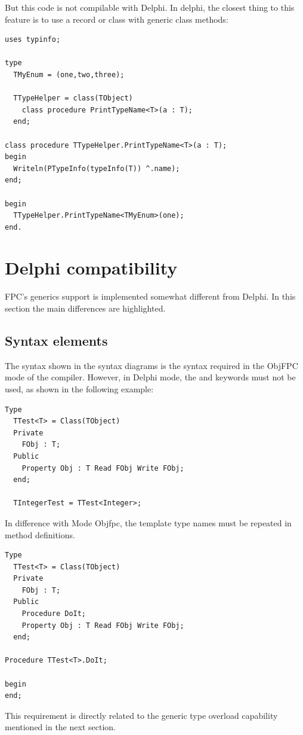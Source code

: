 But this code is not compilable with Delphi. In delphi, the closest thing to
this feature is to use a record or class with generic class methods:
\begin{verbatim}
uses typinfo;

type
  TMyEnum = (one,two,three);

  TTypeHelper = class(TObject)
    class procedure PrintTypeName<T>(a : T);
  end;

class procedure TTypeHelper.PrintTypeName<T>(a : T);
begin
  Writeln(PTypeInfo(typeInfo(T)) ^.name);
end;

begin
  TTypeHelper.PrintTypeName<TMyEnum>(one);
end.
\end{verbatim}

\section{Delphi compatibility}
FPC's generics support is implemented somewhat different from Delphi. In this section the main differences are highlighted.

\subsection{Syntax elements}
The syntax shown in the syntax diagrams is the syntax required in the ObjFPC mode of the compiler.
However, in Delphi mode, the  and  keywords must not be used, as shown in the following example:
\begin{verbatim}
Type
  TTest<T> = Class(TObject)
  Private
    FObj : T;
  Public
    Property Obj : T Read FObj Write FObj;
  end;

  TIntegerTest = TTest<Integer>;
\end{verbatim}
In difference with Mode Objfpc, the template type names must be repeated in method definitions.
\begin{verbatim}
Type
  TTest<T> = Class(TObject)
  Private
    FObj : T;
  Public
    Procedure DoIt;
    Property Obj : T Read FObj Write FObj;
  end;

Procedure TTest<T>.DoIt;

begin
end;
\end{verbatim}
This requirement is directly related to the generic type overload capability mentioned in the next section.

